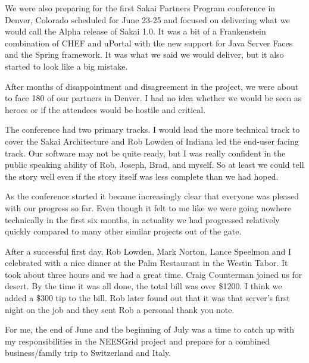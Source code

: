 \documentclass[12pt]{book}
\begin{document}
We were also preparing for the first Sakai Partners Program
conference in Denver, Colorado scheduled for June 23-25 and focused
on delivering what we would call the Alpha release of Sakai 1.0.
It was a bit of a Frankenstein combination of CHEF and uPortal
with the new support for Java Server Faces and the Spring
framework.  It was what we said we would deliver, but
it also started to look like a big mistake.

After months of disappointment and disagreement in the project,
we were about to face 180 of our partners in Denver.  I had no
idea whether we would be seen as heroes or if the attendees would
be hostile and critical.

The conference had two primary tracks.  I would lead the more
technical track to cover the Sakai Architecture and Rob Lowden
of Indiana led the end-user facing track.   Our software may
not be quite ready, but I was really confident in the public speaking
ability of Rob, Joseph, Brad, and myself.  So at least we could
tell the story well even if the story itself was less complete than
we had hoped.

As the conference started it became increasingly clear
that everyone was pleased with our progress so far.   Even
though it felt to me like we were going nowhere technically
in the first six months, in actuality
we had progressed relatively quickly compared to many
other similar projects out of the gate.

After a successful first day, Rob Lowden, Mark
Norton, Lance Speelmon and I celebrated with a
nice dinner at the Palm Restaurant in the Westin Tabor.
It took about three hours and we had a great time.
Craig Counterman joined us for desert.  By the time
it was all done, the total bill was over \$1200.  I think we
added a \$300 tip to the bill. Rob later found out that it was that
server's first night on the job and they sent Rob a personal
thank you note.




For me, the end of June and the beginning of July was
a time to catch up with my responsibilities in
the NEESGrid project and prepare for a combined business\slash family
trip to Switzerland and Italy.
\end{document}
